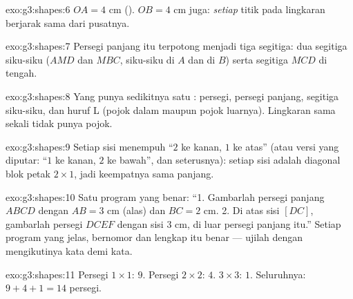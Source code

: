 \begin{solution}{exo:g3:shapes:6}
$OA = 4$ cm (). $OB = 4$ cm juga: \emph{setiap} titik
pada lingkaran berjarak sama dari pusatnya.
\end{solution}

\begin{solution}{exo:g3:shapes:7}
Persegi panjang itu terpotong menjadi tiga segitiga: dua segitiga
siku-siku ($AMD$ dan $MBC$, siku-siku di $A$ dan di $B$) serta
segitiga $MCD$ di tengah.
\end{solution}

\begin{solution}{exo:g3:shapes:8}
Yang punya sedikitnya satu : persegi, persegi
panjang, segitiga siku-siku, dan huruf L (pojok dalam maupun pojok
luarnya). Lingkaran sama sekali tidak punya pojok.
\end{solution}

\begin{solution}{exo:g3:shapes:9}
Setiap sisi menempuh ``$2$ ke kanan, $1$ ke atas'' (atau versi yang
diputar: ``$1$ ke kanan, $2$ ke bawah'', dan seterusnya): setiap
sisi adalah diagonal blok petak $2 \times 1$, jadi keempatnya sama panjang.
\end{solution}

\begin{solution}{exo:g3:shapes:10}
Satu program yang benar: ``1. Gambarlah persegi panjang $ABCD$
dengan $AB = 3$ cm (alas) dan $BC = 2$ cm. 2. Di atas sisi $[DC]$,
gambarlah persegi $DCEF$ dengan sisi $3$ cm, di luar persegi panjang
itu.'' Setiap program yang jelas, bernomor dan lengkap itu benar ---
ujilah dengan mengikutinya kata demi kata.
\end{solution}

\begin{solution}{exo:g3:shapes:11}
Persegi $1 \times 1$: $9$. Persegi $2 \times 2$: $4$.
$3 \times 3$: $1$. Seluruhnya: $9 + 4 + 1 = 14$ persegi.

\end{solution}
